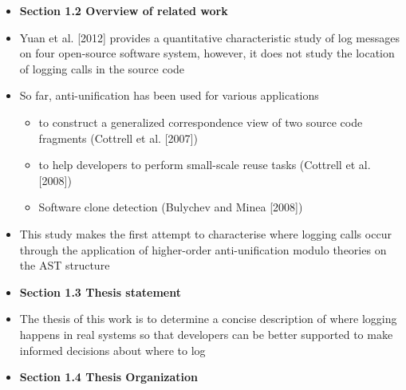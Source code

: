\documentclass{article}
\newcommand{\bold}{\textbf}
\begin{document}
\begin{itemize} [leftmargin=.1in]
\item \bold{Section 1.2 Overview of related work}
\item Yuan et al. [2012]  provides a quantitative characteristic study of log messages on four open-source software system, however, it does not study the location of logging calls in the source code
\item So far, anti-unification has been used for various applications
\begin{itemize}
\item to construct a generalized correspondence view of two source code fragments (Cottrell et al. [2007])
\item to help developers to perform small-scale reuse tasks (Cottrell
et al. [2008])
\item Software clone detection (Bulychev and Minea [2008])
\end{itemize}
\item This study makes the first attempt to characterise where logging calls occur through the application of higher-order anti-unification modulo theories on the AST structure

\item \bold{Section 1.3 Thesis statement}
\item {} The thesis of this work is to determine a concise description of where logging happens in real systems  so that developers can be better supported to make informed decisions about where to log

\item \bold{Section 1.4 Thesis Organization}


\end{itemize}
\end{document}
